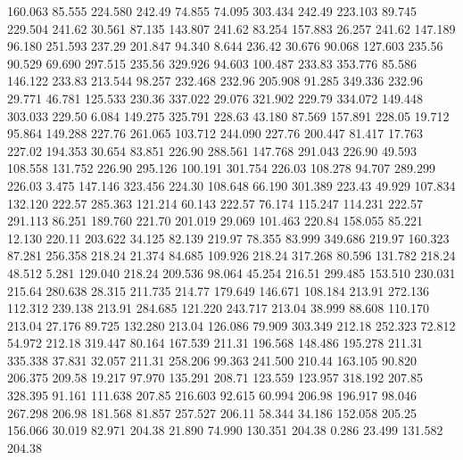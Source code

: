  160.063   85.555  224.580       242.49
  74.855   74.095  303.434       242.49
 223.103   89.745  229.504       241.62
  30.561   87.135  143.807       241.62
  83.254  157.883   26.257       241.62
 147.189   96.180  251.593       237.29
 201.847   94.340    8.644       236.42
  30.676   90.068  127.603       235.56
  90.529   69.690  297.515       235.56
 329.926   94.603  100.487       233.83
 353.776   85.586  146.122       233.83
 213.544   98.257  232.468       232.96
 205.908   91.285  349.336       232.96
  29.771   46.781  125.533       230.36
 337.022   29.076  321.902       229.79
 334.072  149.448  303.033       229.50
   6.084  149.275  325.791       228.63
  43.180   87.569  157.891       228.05
  19.712   95.864  149.288       227.76
 261.065  103.712  244.090       227.76
 200.447   81.417   17.763       227.02
 194.353   30.654   83.851       226.90
 288.561  147.768  291.043       226.90
  49.593  108.558  131.752       226.90
 295.126  100.191  301.754       226.03
 108.278   94.707  289.299       226.03
   3.475  147.146  323.456       224.30
 108.648   66.190  301.389       223.43
  49.929  107.834  132.120       222.57
 285.363  121.214   60.143       222.57
  76.174  115.247  114.231       222.57
 291.113   86.251  189.760       221.70
 201.019   29.069  101.463       220.84
 158.055   85.221   12.130       220.11
 203.622   34.125   82.139       219.97
  78.355   83.999  349.686       219.97
 160.323   87.281  256.358       218.24
  21.374   84.685  109.926       218.24
 317.268   80.596  131.782       218.24
  48.512    5.281  129.040       218.24
 209.536   98.064   45.254       216.51
 299.485  153.510  230.031       215.64
 280.638   28.315  211.735       214.77
 179.649  146.671  108.184       213.91
 272.136  112.312  239.138       213.91
 284.685  121.220  243.717       213.04
  38.999   88.608  110.170       213.04
  27.176   89.725  132.280       213.04
 126.086   79.909  303.349       212.18
 252.323   72.812   54.972       212.18
 319.447   80.164  167.539       211.31
 196.568  148.486  195.278       211.31
 335.338   37.831   32.057       211.31
 258.206   99.363  241.500       210.44
 163.105   90.820  206.375       209.58
  19.217   97.970  135.291       208.71
 123.559  123.957  318.192       207.85
 328.395   91.161  111.638       207.85
 216.603   92.615   60.994       206.98
 196.917   98.046  267.298       206.98
 181.568   81.857  257.527       206.11
  58.344   34.186  152.058       205.25
 156.066   30.019   82.971       204.38
  21.890   74.990  130.351       204.38
   0.286   23.499  131.582       204.38
